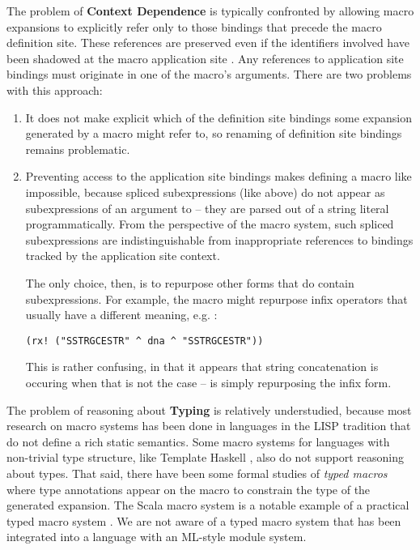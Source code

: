 {{The problem of \textbf{Context Dependence} is typically confronted by allowing macro expansions to explicitly refer only to those bindings that precede the macro definition site. These references are preserved even if the identifiers involved have been shadowed at the macro application site \cite{DBLP:conf/popl/ClingerR91,DBLP:journals/lisp/DybvigHB92,DBLP:conf/popl/Adams15}. Any references to application site bindings must originate in one of the macro's arguments. There are two problems with this approach:
\begin{enumerate}
\item It does not make explicit which of the definition site bindings some expansion generated by a macro might refer to, so renaming of definition site bindings remains problematic. 
\item Preventing access to the application site bindings makes defining a macro like  impossible, because spliced subexpressions (like  above) do not appear as subexpressions of an argument to  -- they are parsed out of a string literal programmatically. From the perspective of the macro system, such spliced subexpressions are indistinguishable from inappropriate references to bindings tracked by the application site context. 

The only choice, then, is to repurpose other forms that do contain subexpressions. For example, the macro might repurpose infix operators that usually have a different meaning, e.g. \li{^}:
\begin{lstlisting}[numbers=none]
(rx! ("SSTRGCESTR" ^ dna ^ "SSTRGCESTR"))
\end{lstlisting}
This is rather confusing, in that it appears that string concatenation is occuring when that is not the case --  is simply repurposing the infix \li{^} form.
\end{enumerate}

The problem of reasoning about \textbf{Typing} is relatively understudied, because most research on macro systems has been done in languages in the LISP tradition that do not define a rich static semantics. Some macro systems for languages with non-trivial type structure, like Template Haskell \cite{sheard2002template}, also do not support reasoning about types. That said, there have been some formal studies of \emph{typed macros} \cite{DBLP:conf/esop/HermanW08,Herman10:Theory} where type annotations appear on the macro to constrain the type of the generated expansion. The Scala macro system is a notable example of a practical typed macro system \cite{ScalaMacros2013}. We are not aware of a typed macro system that has been integrated into a language with an ML-style module system.

}}
